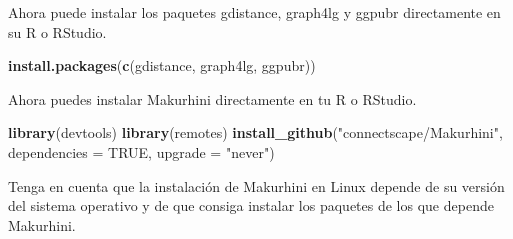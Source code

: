 \documentclass[
]{book}
\newenvironment{Shaded}{\begin{snugshade}}{\end{snugshade}}
\newcommand{\AttributeTok}[1]{\textcolor[rgb]{0.13,0.29,0.53}{#1}}
\newcommand{\ConstantTok}[1]{\textcolor[rgb]{0.56,0.35,0.01}{#1}}
\newcommand{\FunctionTok}[1]{\textcolor[rgb]{0.13,0.29,0.53}{\textbf{#1}}}
\newcommand{\NormalTok}[1]{#1}
\newcommand{\StringTok}[1]{\textcolor[rgb]{0.31,0.60,0.02}{#1}}
\begin{document}
Ahora puede instalar los paquetes gdistance, graph4lg y ggpubr
directamente en su R o RStudio.

\begin{Shaded}
\begin{Highlighting}[]
\FunctionTok{install.packages}\NormalTok{(}\FunctionTok{c}\NormalTok{(}\StringTok{\textquotesingle{}gdistance\textquotesingle{}}\NormalTok{, }\StringTok{\textquotesingle{}graph4lg\textquotesingle{}}\NormalTok{, }\StringTok{\textquotesingle{}ggpubr\textquotesingle{}}\NormalTok{))}
\end{Highlighting}
\end{Shaded}

Ahora puedes instalar Makurhini directamente en tu R o RStudio.

\begin{Shaded}
\begin{Highlighting}[]
\FunctionTok{library}\NormalTok{(devtools) }
\FunctionTok{library}\NormalTok{(remotes) }
\FunctionTok{install\_github}\NormalTok{(}\StringTok{"connectscape/Makurhini"}\NormalTok{, }\AttributeTok{dependencies =} \ConstantTok{TRUE}\NormalTok{, }\AttributeTok{upgrade =} \StringTok{"never"}\NormalTok{) }
\end{Highlighting}
\end{Shaded}

Tenga en cuenta que la instalación de Makurhini en Linux depende de su
versión del sistema operativo y de que consiga instalar los paquetes de
los que depende Makurhini.

  
\end{document}
